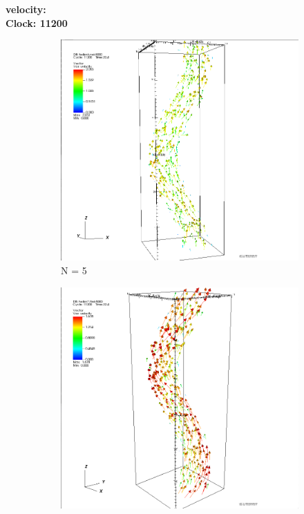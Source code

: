 \documentclass[12pt]{article}
\begin{document}
\noindent \textbf{velocity:}\\
\textbf{Clock: 11200}
\begin{figure}[h]
	\centering
	\begin{subfigure}[h]{0.400\textwidth}
		\centering
		\includegraphics[width=\textwidth]{vector6_11200.png}
		\caption{N = 5}
	\end{subfigure}
	\begin{subfigure}[h]{0.400\textwidth}
		\centering
		\includegraphics[width=\textwidth]{vector7_11200.png}

\end{subfigure}
\end{figure}
\end{document}
